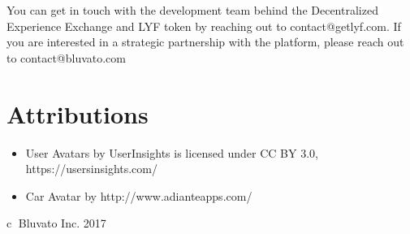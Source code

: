 \documentclass[11pt]{article}
\begin{document}
You can get in touch with the development team behind the Decentralized Experience Exchange and LYF token by reaching out to contact@getlyf.com. If you are interested in a strategic partnership with the platform, please reach out to contact@bluvato.com

\section{Attributions}
\label{sec-8-1}

\begin{itemize}
\item{User Avatars by UserInsights is licensed under CC BY 3.0,
https://usersinsights.com/}
\item{Car Avatar by http://www.adianteapps.com/}

\end{itemize}



\printbibliography

\vspace*{\fill}

\begin{flushright}
{\textcircled{c}} Bluvato Inc. 2017


\end{flushright}
\end{document}
